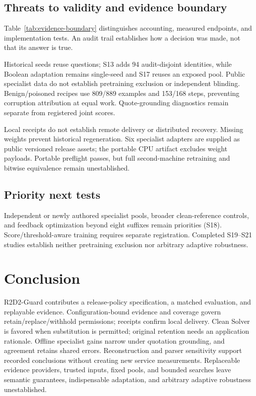 \documentclass[journal]{IEEEtran}
\begin{document}
\subsection{Threats to validity and evidence boundary}
Table~\ref{tab:evidence-boundary} distinguishes accounting, measured endpoints, and implementation tests. An audit trail establishes how a decision was made, not that its answer is true.

Historical seeds reuse questions; S13 adds 94 audit-disjoint identities, while Boolean adaptation remains single-seed and S17 reuses an exposed pool. Public specialist data do not establish pretraining exclusion or independent blinding. Benign/poisoned recipes use 809/889 examples and 153/168 steps, preventing corruption attribution at equal work. Quote-grounding diagnostics remain separate from registered joint scores.

Local receipts do not establish remote delivery or distributed recovery. Missing weights prevent historical regeneration. Six specialist adapters are supplied as public versioned release assets; the portable CPU artifact excludes weight payloads. Portable preflight passes, but full second-machine retraining and bitwise equivalence remain unestablished.

\subsection{Priority next tests}
Independent or newly authored specialist pools, broader clean-reference controls, and feedback optimization beyond eight suffixes remain priorities (S18). Score/threshold-aware training requires separate registration. Completed S19--S21 studies establish neither pretraining exclusion nor arbitrary adaptive robustness.

\section{Conclusion}
R2D2-Guard contributes a release-policy specification, a matched evaluation, and replayable evidence. Configuration-bound evidence and coverage govern retain/replace/withhold permissions; receipts confirm local delivery. Clean Solver is favored when substitution is permitted; original retention needs an application rationale. Offline specialist gains narrow under quotation grounding, and agreement retains shared errors. Reconstruction and parser sensitivity support recorded conclusions without creating new service measurements. Replaceable evidence providers, trusted inputs, fixed pools, and bounded searches leave semantic guarantees, indispensable adaptation, and arbitrary adaptive robustness unestablished.
\end{document}

